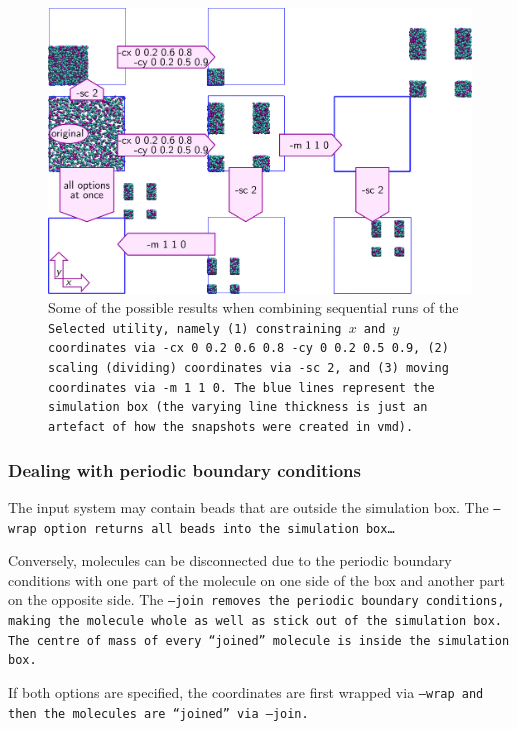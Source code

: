 \begin{figure}[t]
  \centering
  \includegraphics{Selected.png}
  \caption{
    Some of the possible results when combining sequential runs of the
    \tt{Selected} utility, namely (1) constraining $x$ and $y$ coordinates via
    \tt{-cx 0 0.2 0.6 0.8 -cy 0 0.2 0.5 0.9}, (2) scaling (dividing) coordinates
    via \tt{-sc 2}, and (3) moving coordinates via \tt{-m 1 1 0}. The blue lines
    represent the simulation box (the varying line thickness is just an
    artefact of how the snapshots were created in \tt{vmd}).
  }
  \label{fig:Selected}
\end{figure}

\subsubsection{Dealing with periodic boundary conditions}

The input system may contain beads that are outside the simulation box. The
\tt{--wrap} option returns all beads into the simulation box\dots

Conversely, molecules can be disconnected due to the periodic boundary
conditions with one part of the molecule on one side of the box and another part
on the opposite side. The \tt{--join} removes the periodic boundary conditions,
making the molecule whole as well as stick out of the simulation box. The centre
of mass of every \enquote{joined} molecule is inside the simulation box.

If both options are specified, the coordinates are first wrapped via \tt{--wrap}
and then the molecules are \enquote{joined} via \tt{--join}.

